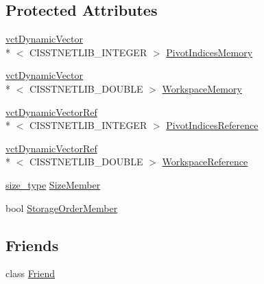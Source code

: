 \subsection*{Protected Attributes}
\begin{DoxyCompactItemize}
\item 
\hyperlink{classvct_dynamic_vector}{vct\-Dynamic\-Vector}\\*
$<$ C\-I\-S\-S\-T\-N\-E\-T\-L\-I\-B\-\_\-\-I\-N\-T\-E\-G\-E\-R $>$ \hyperlink{classnmr_inverse_dynamic_data_a011a6d0e52a20011ac77ac48ea65dc1b}{Pivot\-Indices\-Memory}
\item 
\hyperlink{classvct_dynamic_vector}{vct\-Dynamic\-Vector}\\*
$<$ C\-I\-S\-S\-T\-N\-E\-T\-L\-I\-B\-\_\-\-D\-O\-U\-B\-L\-E $>$ \hyperlink{classnmr_inverse_dynamic_data_ae76c0f077fd60cafab907d5f0e20a490}{Workspace\-Memory}
\end{DoxyCompactItemize}
{\bf }\par
\begin{DoxyCompactItemize}
\item 
\hyperlink{classvct_dynamic_vector_ref}{vct\-Dynamic\-Vector\-Ref}\\*
$<$ C\-I\-S\-S\-T\-N\-E\-T\-L\-I\-B\-\_\-\-I\-N\-T\-E\-G\-E\-R $>$ \hyperlink{classnmr_inverse_dynamic_data_ad6e68ee1c9a9705d80c5b8e69c2ec34d}{Pivot\-Indices\-Reference}
\item 
\hyperlink{classvct_dynamic_vector_ref}{vct\-Dynamic\-Vector\-Ref}\\*
$<$ C\-I\-S\-S\-T\-N\-E\-T\-L\-I\-B\-\_\-\-D\-O\-U\-B\-L\-E $>$ \hyperlink{classnmr_inverse_dynamic_data_a5233a5419f7da87a54abd486832b0817}{Workspace\-Reference}
\end{DoxyCompactItemize}

{\bf }\par
\begin{DoxyCompactItemize}
\item 
\hyperlink{classnmr_inverse_dynamic_data_aeb5c2317adf50d8fc7952a9b38bf0129}{size\-\_\-type} \hyperlink{classnmr_inverse_dynamic_data_ae4b1064f9e37250025710add092a33cf}{Size\-Member}
\item 
bool \hyperlink{classnmr_inverse_dynamic_data_a295f57a6eaeca3374aa4e58e983ccefd}{Storage\-Order\-Member}
\end{DoxyCompactItemize}

\subsection*{Friends}
\begin{DoxyCompactItemize}
\item 
class \hyperlink{classnmr_inverse_dynamic_data_a7f8321d57e81bc613d5dbef3410ba70e}{Friend}
\end{DoxyCompactItemize}


